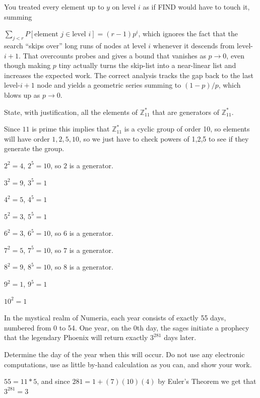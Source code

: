 \documentclass[12pt, letterpaper]{article}
\newcommand{\Z}{\mathbb{Z}}
\begin{document}
\color{\TextColor}
\pagecolor{\colormode}
\setlength{\parindent}{0pt}
\pagestyle{fancy}
\fancyhf{}
\fancyhead[ROE]{\color{\TextColor}\thepage}

\begin{solution}
    You treated every element up to $y$ on level $i$ as if FIND would have to touch it, summing 
    
    \noindent \(\sum_{j<r}P[\text{element }j\in\text{level }i]= (r-1)p^i\), which ignores the fact that the search “skips over” long runs of nodes at level $i$ whenever it descends from level-{$i+1$}.  That overcounts probes and gives a bound that vanishes as \(p\to0\), even though making \(p\) tiny actually turns the skip-list into a near-linear list and increases the expected work.  The correct analysis tracks the gap back to the last level-\(i+1\) node and yields a geometric series summing to \((1-p)/p\), which blows up as \(p\to0\).
\end{solution}

\begin{subproblem}{}
    State, with justification, all the elements of $\mathbb{Z}_{11}^*$ that are generators of $\mathbb{Z}_{11}^*$.
\end{subproblem}
\begin{problemproof}
    Since $11$ is prime this implies that $\Z_11^*$ is a cyclic group of order 10, so elements will have order $1,2,5,10$, so we just have to check powers of 1,2,5 to see if they generate the group.

    $2^2=4$, $2^5=10$, so $2$ is a generator.

    $3^2=9$, $3^5=1$

    $4^2=5$, $4^5=1$

    $5^2=3$, $5^5=1$

    $6^2=3$, $6^5=10$, so $6$ is a generator.

    $7^2=5$, $7^5=10$, so $7$ is a generator.

    $8^2=9$, $8^5=10$, so $8$ is a generator.

    $9^2=1$, $9^5=1$

    $10^2=1$
\end{problemproof}

\begin{subproblem}{}
    In the mystical realm of Numeria, each year consists of exactly 55 days, numbered from 0 to 54.
    One year, on the 0th day, the sages initiate a prophecy that the legendary Phoenix will return exactly $3^{281}$ days later.

    Determine the day of the year when this will occur.
    Do not use any electronic computations, use as little by-hand calculation as you can, and show your work.
\end{subproblem}
\begin{problemproof}
    $55=11*5$, and since $281=1+(7)(10)(4)$ by Euler's Theorem we get that $3^{281}=3$
\end{problemproof}
\end{document}
